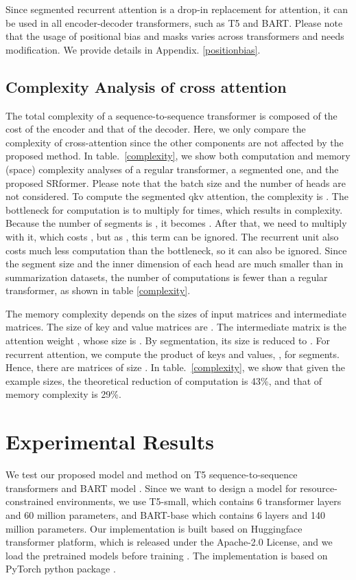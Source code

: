 \documentclass[11pt]{article}
\begin{document}
Since segmented recurrent attention is a drop-in replacement for attention, it can be used in all encoder-decoder transformers, such as T5 and BART. Please note that the usage of positional bias and masks varies across transformers and needs modification. We provide details in Appendix. \ref{positionbias}.

\subsection{Complexity Analysis of cross attention}
The total complexity of a sequence-to-sequence transformer is composed of the cost of the encoder and that of the decoder. Here, we only compare the complexity of cross-attention since the other components are not affected by the proposed method. In table.~\ref{complexity}, we show both computation and memory (space) complexity analyses of a regular transformer, a segmented one, and the proposed SRformer. Please note that the batch size and the number of heads are not considered. To compute the segmented qkv attention, the complexity is . The bottleneck for computation is to multiply  for  times, which results in  complexity. Because the number of segments is , it becomes . After that, we need to multiply  with it, which costs , but as , this term can be ignored. The recurrent unit also costs much less computation than the bottleneck, so it can also be ignored. Since the segment size  and the inner dimension  of each head are much smaller than  in summarization datasets, the number of computations is fewer than a regular transformer, as shown in table \ref{complexity}. 

The memory complexity depends on the sizes of input matrices and intermediate matrices. The size of key and value matrices are . The intermediate matrix is the attention weight , whose size is . By segmentation, its size is reduced to . For recurrent attention, we compute the product of keys and values, , for  segments. Hence, there are  matrices of size . In table.~\ref{complexity}, we show that given the example sizes, the theoretical reduction of computation is 43\%, and that of memory complexity is 29\%.


\section{Experimental Results}
\vspace{-2mm} We test our proposed model and method on T5 sequence-to-sequence transformers \citep{T5} and BART model \cite{lewis-etal-2020-bart}. Since we want to design a model for resource-constrained environments, we use T5-small, which contains 6 transformer layers and 60 million parameters, and BART-base which contains 6 layers and 140 million parameters. Our implementation is built based on Huggingface transformer platform, which is released under the Apache-2.0 License, and we load the pretrained models before training \citep{Huggingface}. The implementation is based on  PyTorch python package \citep{Paszke_PyTorch_An_Imperative_2019}.
\end{document}
